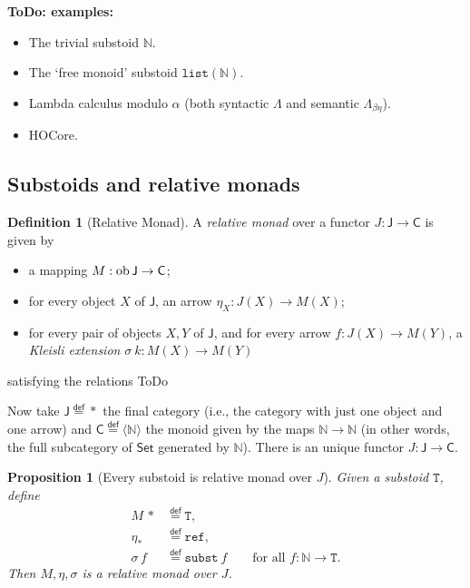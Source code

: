 \documentclass[a4paper,twoside,12pt]{article}
\newtheorem{proposition}{Proposition}
\theoremstyle{definition}
\newtheorem{definition}{Definition}
\theoremstyle{remark}
\newcommand{\NN}{\mathbb{N}}
\newcommand{\subst}{\mathtt{subst}}
\newcommand{\refe}{\mathtt{ref}}
\newcommand{\TT}{\mathtt{T}}
\begin{document}
\textbf{ToDo: examples:}
\begin{itemize}
\item The trivial substoid $\NN$.
\item The `free monoid' substoid $\mathtt{list}(\NN)$.
\item Lambda calculus modulo $\alpha$ (both syntactic $\Lambda$ and
  semantic $\Lambda_{\beta\eta}$).
\item HOCore.
\end{itemize}

\subsection{Substoids and relative monads}
\label{sec:subst-rel-monads}

\begin{definition}[Relative Monad]
  A \emph{relative monad} over a functor $J\colon \mathsf{J}\to \mathsf{C}$
  is given by
  \begin{itemize}
  \item a mapping $M:\mathop{\hbox{ob}} \mathsf{J} \to \mathsf{C}$;
  \item for every object $X$ of $\mathsf{J}$, an arrow $\eta_X\colon
    J(X) \to M(X)$;
  \item for every pair of objects $X,Y$ of $\mathsf{J}$, and for every
    arrow $f\colon J(X) \to M(Y)$, a \emph{Kleisli extension} $\sigma\
    k\colon M(X) \to M(Y)$
  \end{itemize}
  satisfying the relations
  ToDo
\end{definition}

Now take $\mathsf{J}\stackrel{\mathsf{def}}{=}*$ the final category
(i.e., the category with just one object and one arrow) and
$\mathsf{C}\stackrel{\mathsf{def}}{=}\langle\NN\rangle$ the monoid given
by the maps $\NN\to\NN$ (in other words, the full subcategory of
$\mathsf{Set}$ generated by $\NN$).  There is an unique functor
$J\colon \mathsf{J} \to \mathsf{C}$.

\begin{proposition}[Every substoid is relative monad over $J$]
  Given a substoid $\TT$, define
  \begin{align*}
    M\, * &\stackrel{\mathsf{def}}{=} \TT, \\
    \eta_* &\stackrel{\mathsf{def}}{=} \refe, \\
    \sigma\, f &\stackrel{\mathsf{def}}{=} \subst\ f
                 \qquad\text{for all $f:\NN\to\TT$}.
  \end{align*}
  Then $M,\eta,\sigma$ is a relative monad over $J$.
\end{proposition}
\end{document}
